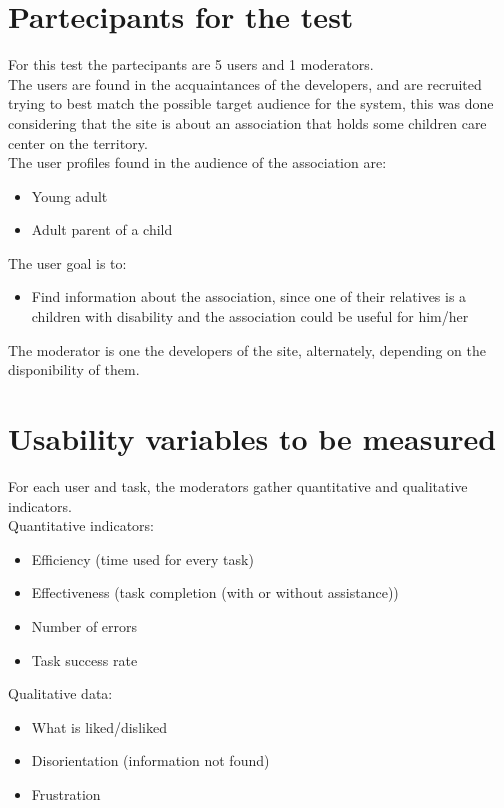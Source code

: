 \section{Partecipants for the test}
For this test the partecipants are 5 users and 1 moderators.\\
The users are found in the acquaintances of the developers, and are recruited trying to best match the possible target audience for the system, this was done considering that the site is about an association that holds some children care center on the territory.\\
The user profiles found in the audience of the association are: 
\begin{itemize}
\item Young adult
\item Adult parent of a child
\end{itemize}
The user goal is to:
\begin{itemize}
\item Find information about the association, since one of their relatives is a children with disability and the association could be useful for him/her
\end{itemize}
The moderator is one the developers of the site, alternately, depending on the disponibility of them.
%
%
\section{Usability variables to be measured}
For each user and task, the moderators gather quantitative and qualitative indicators.\\
Quantitative indicators:
\begin{itemize}
\item Efficiency (time used for every task)
\item Effectiveness (task completion (with or without assistance))
\item Number of errors
\item Task success rate
\end{itemize}
Qualitative data:
\begin{itemize}
\item What is liked/disliked
\item Disorientation (information not found)
\item Frustration
\end{itemize}
%
%
